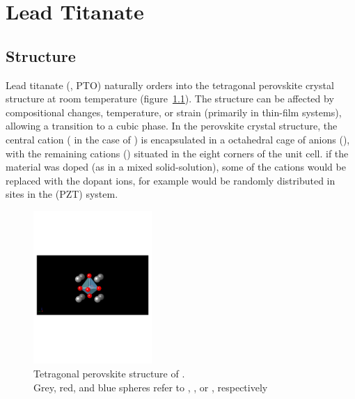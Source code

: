 \chapter{Lead Titanate}
\label{chap:\thechapter}
\thispagestyle{empty}



\section{Structure}

Lead titanate (\PTO{}, PTO) naturally orders into the tetragonal perovskite crystal structure at room temperature (figure~\ref{fig:PTO-crystal}). The structure can be affected by compositional changes, temperature, or strain (primarily in thin-film systems), allowing a transition to a cubic phase. In the perovskite crystal structure, the central cation (\TiIon{} in the case of \PTO{}) is encapsulated in a octahedral cage of anions (\OIon{}), with the remaining cations (\PbIon{}) situated in the eight corners of the unit cell. if the material was doped (as in a mixed solid-solution), some of the cations would be replaced with the dopant ions, for example \ZrIon{} would be randomly distributed in  \TiIon{} sites in the \PZT{} (PZT) system.

\begin{figure}[htb]
   \begin{center}
   \includegraphics[width=0.4\textwidth]{./figures/materials/pbtio3-crystal.pdf} 
   \caption[Crystal structure of \PTO{}]{Tetragonal perovskite structure of \PTO{}. \\Grey, red, and blue spheres refer to \PbIon{}, %
   		\TiIon{}, or \OIon{}, respectively}
   \label{fig:PTO-crystal}
   \end{center}
\end{figure}

